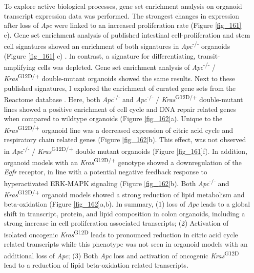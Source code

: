 \begin{flushleft}
To explore active biological processes, gene set enrichment analysis on organoid transcript expression data was performed. The strongest changes in expression after loss of \textit{Apc} were linked to an increased proliferation rate (Figure \ref{fig_161} e). Gene set enrichment analysis of published intestinal cell-proliferation and stem cell signatures showed an enrichment of both signatures in \textit{Apc}\textsuperscript{-/-}  organoids (Figure \ref{fig_161} e) \parencite{merlos-suarezIntestinalStemCell2011}. In contrast, a signature for differentiating, transit-amplifying cells was depleted. Gene set enrichment analysis of \textit{Apc}\textsuperscript{-/-} / \textit{Kras}\textsuperscript{G12D/+} double-mutant organoids showed the same results. Next to these published signatures, I explored the enrichment of curated gene sets from the Reactome database \parencite{grissReactomeGSAEfficientMultiOmics2020}. Here, both \textit{Apc}\textsuperscript{-/-}  and \textit{Apc}\textsuperscript{-/-} / \textit{Kras}\textsuperscript{G12D/+} double-mutant lines showed a positive enrichment of cell cycle and DNA repair related genes when compared to wildtype organoids (Figure \ref{fig_162}a). Unique to the \textit{Kras}\textsuperscript{G12D/+} organoid line was a decreased expression of citric acid cycle and respiratory chain related genes (Figure \ref{fig_162}b). This effect, was not observed in \textit{Apc}\textsuperscript{-/-} / \textit{Kras}\textsuperscript{G12D/+} double mutant organoids (Figure \ref{fig_161}f). In addition, organoid models with an \textit{Kras}\textsuperscript{G12D/+} genotype showed a downregulation of the \textit{Egfr} receptor, in line with a potential negative feedback response to hyperactivated ERK-MAPK signaling (Figure \ref{fig_162}b). Both \textit{Apc}\textsuperscript{-/-}  and \textit{Kras}\textsuperscript{G12D/+} organoid models showed a strong reduction of lipid metabolism and beta-oxidation (Figure \ref{fig_162}a,b). In summary, (1) loss of \textit{Apc} leads to a global shift in transcript, protein, and lipid composition in colon organoids, including a strong increase in cell proliferation associated transcripts; (2) Activation of isolated oncogenic \textit{Kras}\textsuperscript{G12D} leads to pronounced reduction in citric acid cycle related transcripts while this phenotype was not seen in organoid models with an additional loss of \textit{Apc}; (3) Both \textit{Apc} loss and activation of oncogenic \textit{Kras}\textsuperscript{G12D} lead to a reduction of lipid beta-oxidation related transcripts.


\end{flushleft}

